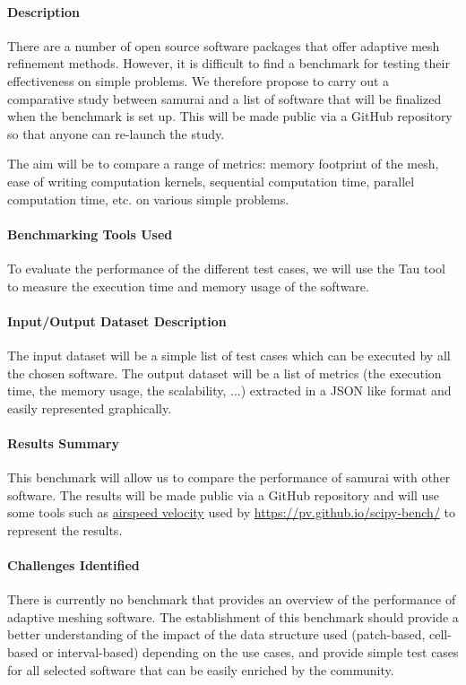 \paragraph{Description}

There are a number of open source software packages that offer adaptive mesh refinement methods. However, it is difficult to find a benchmark for testing their effectiveness on simple problems. We therefore propose to carry out a comparative study between samurai and a list of software that will be finalized when the benchmark is set up. This will be made public via a GitHub repository so that anyone can re-launch the study.

The aim will be to compare a range of metrics: memory footprint of the mesh, ease of writing computation kernels, sequential computation time, parallel computation time, etc. on various simple problems.

\paragraph{Benchmarking Tools Used}
To evaluate the performance of the different test cases, we will use the Tau tool to measure the execution time and memory usage of the software.

\paragraph{Input/Output Dataset Description}
The input dataset will be a simple list of test cases which can be executed by all the chosen software. The output dataset will be a list of metrics (the execution time, the memory usage, the scalability, ...) extracted in a JSON like format and easily represented graphically.

\paragraph{Results Summary}
This benchmark will allow us to compare the performance of samurai with other software. The results will be made public via a GitHub repository and will use some tools such as \href{https://github.com/airspeed-velocity/asv}{airspeed velocity} used by \href{scipy}{https://pv.github.io/scipy-bench/} to represent the results.

\paragraph{Challenges Identified}
There is currently no benchmark that provides an overview of the performance of adaptive meshing software. The establishment of this benchmark should provide a better understanding of the impact of the data structure used (patch-based, cell-based or interval-based) depending on the use cases, and provide simple test cases for all selected software that can be easily enriched by the community.


